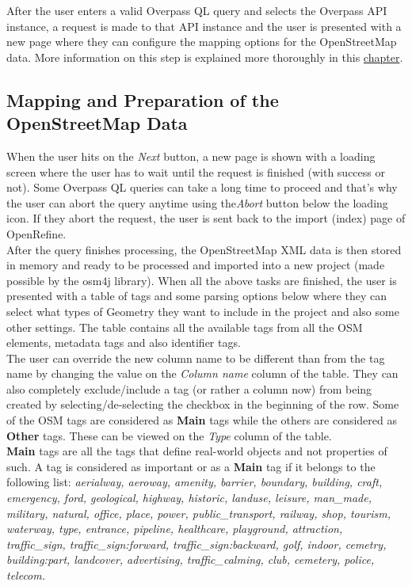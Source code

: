 After the user enters a valid Overpass QL query and selects the Overpass API instance, a request is made to that API instance and
the user is presented with a new page where they can configure the mapping options for the OpenStreetMap data. More information on
this step is explained more thoroughly in this
\hyperref[sec:mapping-preparation-of-openstreetmap-data]{chapter}.
\subsection{Mapping and Preparation of the OpenStreetMap Data}\label{sec:mapping-preparation-of-openstreetmap-data}
When the user hits on the \textit{Next} button, a new page is shown with a loading screen where the user has to wait until
the request is finished (with success or not). Some Overpass QL queries can take a long time to proceed and that's why
the user can abort the query anytime using the\textit{Abort} button below the loading icon. If they abort the request,
the user is sent back to the import (index) page of OpenRefine.\\
\newline
After the query finishes processing, the OpenStreetMap XML data is then stored in memory and ready to be processed and
imported into a new project (made possible by the osm4j library).
\newline
When all the above tasks are finished, the user is presented with a table of tags and some parsing options below where they
can select what types of Geometry they want to include in the project and also some other settings. The table contains
all the available tags from all the OSM elements, metadata tags and also identifier tags. \\
\newline
The user can override the new column name to be different than from the tag name by changing the value on the
\textit{Column name} column of the table. They can also completely exclude/include a tag (or rather a column now) from being created
by selecting/de-selecting the checkbox in the beginning of the row. Some of the OSM tags are considered as \textbf{Main}
tags while the others are considered as \textbf{Other} tags. These can be viewed on the \textit{Type} column of the table.\\
\newline
\textbf{Main} tags are all the tags that define real-world objects and not properties of such.
A tag is considered as important or as a \textbf{Main} tag if it belongs to the following list:
\textit{aerialway, aeroway, amenity, barrier, boundary, building, craft, emergency, ford, geological, highway, historic,
landuse, leisure, man\_made, military, natural,
office, place, power, public\_transport, railway, shop, tourism, waterway, type, entrance, pipeline, healthcare,
playground, attraction, traffic\_sign, traffic\_sign:forward, traffic\_sign:backward, golf, indoor, cemetry, building:part,
landcover, advertising, traffic\_calming, club, cemetery, police, telecom.}\\

